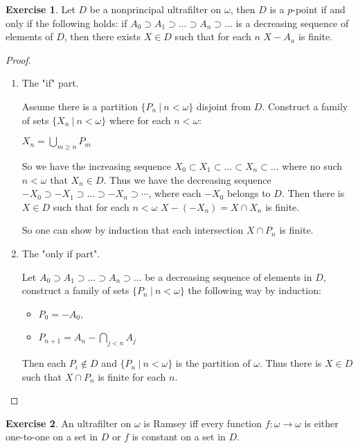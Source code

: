 \documentclass[8pt]{article}
\theoremstyle{definition}
\theoremstyle{definition}
\theoremstyle{definition}
\theoremstyle{definition}
\theoremstyle{definition}
\theoremstyle{definition}
\theoremstyle{definition}
\theoremstyle{definition}
\theoremstyle{definition}
\theoremstyle{definition}
\theoremstyle{definition}
\theoremstyle{definition}
\theoremstyle{definition}
\newtheorem{exercise}{Exercise}[section]
\theoremstyle{definition}
\theoremstyle{question}
\begin{document}
\begin{exercise}
  Let $D$ be a nonprincipal ultrafilter on $\omega$, then $D$ is a $p$-point if and only if the following holds:
  if $A_0 \supset A_1 \supset \ldots \supset A_n \supset \dots$ is a decreasing sequence of elements of $D$, then
  there exists $X \in D$ such that for each $n$ $X - A_n$ is finite.
\end{exercise}

\begin{proof}
$ $ 

\begin{enumerate}
  \item The "if" part.
  
  Assume there is a partition $\{ P_n \: | \: n < \omega \}$ disjoint from $D$.
  Construct a family of sets $\{ X_n \: | \: n < \omega \}$ where for each $n < \omega$:
  \begin{center}
  $X_n = \bigcup_{m \geq n} P_m$
  \end{center}
  So we have the increasing sequence $X_0 \subset X_1 \subset \ldots \subset X_n \subset \dots$
  where no such $n < \omega$ that $X_n \in D$. Thus we have the decreasing sequence
  $- X_0 \supset - X_1 \supset \ldots \supset - X_n \supset \cdots$, where each $- X_0$ belongs to $D$. 
  Then there is $X \in D$ such that for each $n < \omega$ $X - (- X_n) = X \cap X_n$ is finite.

  So one can show by induction that each intersection $X \cap P_n$ is finite.
  \item The "only if part".

  Let $A_0 \supset A_1 \supset \ldots \supset A_n \supset \dots$ be a decreasing sequence of elements in $D$,
  construct a family of sets $\{ P_n \: | \: n < \omega \}$ the following way by induction:
  \begin{itemize}
    \item $P_0 = - A_0$,
    \item $P_{n + 1} = A_n - \bigcap \limits_{j < n} A_j$
  \end{itemize}
  Then each $P_i \notin D$ and $\{ P_n \: | \: n < \omega \}$ is the partition of $\omega$.
  Thus there is $X \in D$ such that $X \cap P_n$ is finite for each $n$.
\end{enumerate}
\end{proof}

\begin{exercise}
  An ultrafilter on $\omega$ is Ramsey iff every function $f : \omega \to \omega$ is either 
  one-to-one on a set in $D$ or $f$ is constant on a set in $D$.
\end{exercise}
\end{document}
